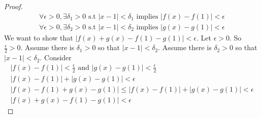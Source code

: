 \documentclass{article}
\theoremstyle{claim}
\theoremstyle{definition}
\begin{document}
\begin{enumerate}
\begin{proof}
            \begin{gather*}
                \forall \epsilon > 0, \exists \delta_1 > 0 \text{ s.t } |x - 1| < \delta_1 \text{ implies } |f(x) - f(1)| < \epsilon\\
                \forall \epsilon > 0, \exists \delta_2 > 0 \text{ s.t } |x - 1| < \delta_2 \text{ implies } |g(x) - g(1)| < \epsilon
            \end{gather*}
            We want to show that $|f(x) + g(x) - f(1) - g(1)| < \epsilon$.
            Let $\epsilon > 0$. So $\frac{\epsilon}{2} > 0$. Assume there is $\delta_1 > 0$ so that $|x - 1| < \delta_2$. Assume there is $\delta_2 > 0$ so that $|x - 1| < \delta_2$. Consider
            \begin{gather*}
                |f(x) - f(1)| < \frac{\epsilon}{2} \text{ and } |g(x) - g(1)| < \frac{\epsilon}{2}\\
                |f(x) - f(1)| + |g(x) - g(1)| < \epsilon\\
                |f(x) - f(1) + g(x) - g(1)| \le |f(x) - f(1)| + |g(x) - g(1)| < \epsilon\\
                |f(x) + g(x) - f(1) - g(1)| < \epsilon
            \end{gather*}
        \end{proof}
\end{enumerate}
\end{document}
